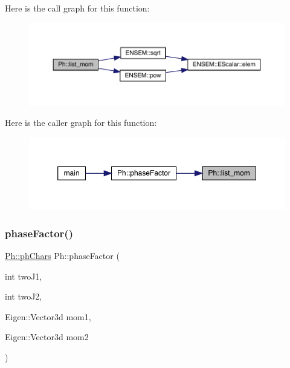 Here is the call graph for this function\+:
\nopagebreak
\begin{figure}[H]
\begin{center}
\leavevmode
\includegraphics[width=350pt]{d6/d3c/namespacePh_a54c2023181613e6aacf1ec346c11bf9a_cgraph}
\end{center}
\end{figure}
Here is the caller graph for this function\+:
\nopagebreak
\begin{figure}[H]
\begin{center}
\leavevmode
\includegraphics[width=350pt]{d6/d3c/namespacePh_a54c2023181613e6aacf1ec346c11bf9a_icgraph}
\end{center}
\end{figure}
\mbox{\label{namespacePh_a51140cf285f02c028134a1e40807b54b}} 
\subsubsection{\texorpdfstring{phaseFactor()}{phaseFactor()}\hspace{0.1cm}{\footnotesize\ttfamily [1/2]}}
{\footnotesize\ttfamily \mbox{\hyperlink{structPh_1_1phChars}{Ph\+::ph\+Chars}} Ph\+::phase\+Factor (\begin{DoxyParamCaption}\item[{int}]{two\+J1,  }\item[{int}]{two\+J2,  }\item[{Eigen\+::\+Vector3d}]{mom1,  }\item[{Eigen\+::\+Vector3d}]{mom2 }\end{DoxyParamCaption})}

